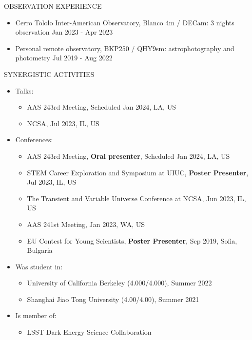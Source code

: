 \documentclass[10pt]{article} %
\begin{document}
\begin{section}{OBSERVATION EXPERIENCE}
    
\begin{itemize}[leftmargin=1.5em]
    \item Cerro Tololo Inter-American Observatory, Blanco 4m / DECam: 3 nights observation \hfill Jan 2023 - Apr 2023
    \item Personal remote observatory, BKP250 / QHY9sm: astrophotography and photometry \hfill Jul 2019 - Aug 2022
\end{itemize}

\end{section}

\begin{section}{SYNERGISTIC ACTIVITIES}
    
\begin{itemize}[leftmargin=1.5em]
    \item Talks: 
    \begin{itemize}[leftmargin=1.5em]
        \item AAS 243rd Meeting, Scheduled Jan 2024, LA, US
        \item NCSA, Jul 2023, IL, US
    \end{itemize}
    \item Conferences: 
    \begin{itemize}[leftmargin=1.5em]
        \item AAS 243rd Meeting, \textbf{Oral presenter}, Scheduled Jan 2024, LA, US
        \item STEM Career Exploration and Symposium at UIUC, \textbf{Poster Presenter}, Jul 2023, IL, US
        \item The Transient and Variable Universe Conference at NCSA, Jun 2023, IL, US
        \item AAS 241st Meeting, Jan 2023, WA, US
        \item EU Contest for Young Scientists, \textbf{Poster Presenter}, Sep 2019, Sofia, Bulgaria
    \end{itemize}
    \item Was student in: 
    \begin{itemize}[leftmargin=1.5em]
        \item University of California Berkeley (4.000/4.000), Summer 2022
        \item Shanghai Jiao Tong University (4.00/4.00), Summer 2021
    \end{itemize}
    \item Is member of: 
    \begin{itemize}[leftmargin=1.5em]
        \item LSST Dark Energy Science Collaboration
    \end{itemize}
\end{itemize}

\end{section}
\end{document}
